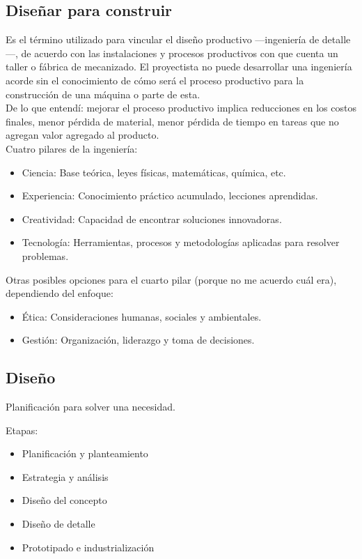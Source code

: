 \documentclass[spanish,11pt,a4paper]{article}
\begin{document}
	\subsection{Diseñar para construir}
	Es el término utilizado para vincular el diseño productivo —ingeniería de detalle—, de acuerdo con las instalaciones y procesos productivos con que cuenta un taller o fábrica
	de mecanizado. El proyectista no puede desarrollar una ingeniería acorde sin el conocimiento de cómo será el proceso
	productivo para la construcción de una máquina o parte de esta.
	\\	
	De lo que entendí: mejorar el proceso productivo implica reducciones en los costos finales, menor pérdida de material, menor pérdida de tiempo en tareas que no agregan valor agregado al producto.
	\\
	Cuatro pilares de la ingeniería:
	\begin{itemize}
		\item Ciencia: Base teórica, leyes físicas, matemáticas, química, etc.
		
		\item Experiencia: Conocimiento práctico acumulado, lecciones aprendidas.
		
		\item Creatividad: Capacidad de encontrar soluciones innovadoras.
		
		\item Tecnología: Herramientas, procesos y metodologías aplicadas para resolver problemas.
	\end{itemize}
	Otras posibles opciones para el cuarto pilar (porque no me acuerdo cuál era), dependiendo del enfoque:
	\begin{itemize}
	\item Ética: Consideraciones humanas, sociales y ambientales.
	\item Gestión: Organización, liderazgo y toma de decisiones.
	\end{itemize}
	
	\subsection{Diseño}
	
	Planificación para solver una necesidad.
	
	Etapas:
	\begin{itemize}
		\item Planificación y planteamiento
		\item Estrategia y análisis
		\item Diseño del concepto
		\item Diseño de detalle
		\item Prototipado e industrialización
	\end{itemize}
	
\end{document}

